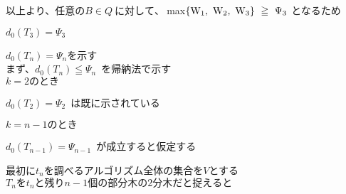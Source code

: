 \documentclass[11pt]{jarticle} %
\begin{document}
以上より、$任意のB\in Q~に対して、~$max$\{{\rm W_{1}},~{\rm W_{2}},~{\rm W_{3}}\}~\geqq~\Psi_3~$となるため
\begin{center}
  $d_0(T_3)=\Psi_3$
\end{center}


\newpage

$d_0(T_n) = \Psi_n$を示す\\

まず、$d_0(T_n) \leqq \Psi_n$~を帰納法で示す\\

\underline{$k=2のとき$}
\begin{center}
  $d_0(T_2)=\Psi_2$~は既に示されている
\end{center}
\underline{$k=n-1のとき$}
\begin{center}
  $d_0(T_{n-1})=\Psi_{n-1}$~が成立すると仮定する
\end{center}

最初に$t_n$を調べるアルゴリズム全体の集合を$V$とする\\
$T_nをt_nと残りn-1個の部分木の2分木だと捉えると$
\end{document}
